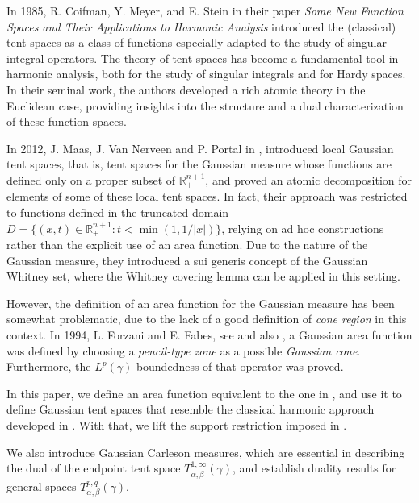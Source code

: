 \documentclass[leqno,11pt]{amsart}
\theoremstyle{plain}
\theoremstyle{remark}
\begin{document}
In 1985, R. Coifman, Y. Meyer, and E. Stein in their paper {\em Some New Function Spaces and Their Applications to Harmonic Analysis} \cite{cms} introduced the (classical)  tent spaces as a class of functions especially adapted to the study of singular integral operators. The theory of tent spaces has become a fundamental tool in harmonic analysis, both for the study of singular integrals and for Hardy spaces. In their seminal work, the authors developed a rich atomic theory in the Euclidean case, providing insights into the structure and a dual characterization of these function spaces.

In 2012, J. Maas, J. Van Nerveen and P. Portal in \cite{MNP}, 
introduced local Gaussian tent spaces, that is, tent spaces for the Gaussian measure whose functions are defined only on a proper subset of $\mathbb{R}^{n+1}_+$,  
and proved an atomic decomposition for elements of some of these local tent spaces. 
In fact, their approach was restricted to functions defined in the truncated domain \( D = \{(x,t)\in \mathbb{R}^{n+1}_+ : t < \min (1, 1/|x|)\} \), relying on ad hoc constructions rather than the explicit use of an area function. 
Due to the nature of the Gaussian measure, they introduced a sui generis concept of the Gaussian Whitney set, where the Whitney covering lemma can be applied in this setting.  


However, the definition of an area function for the Gaussian measure has been
somewhat problematic, due to the lack of a good definition of
\emph{cone region} in this context. In 1994, L. Forzani and E.
Fabes, see \cite{for} and also \cite{FSU}, a Gaussian area function was defined by choosing a {\em pencil-type zone} as a possible {\em Gaussian cone}. Furthermore, the $L^p(\gamma)$ boundedness of that operator was proved. 


In this paper, we define an area function equivalent to the one in \cite{FSU}, and use it to define Gaussian tent spaces that resemble the classical harmonic approach developed in \cite{cms}. With that, we lift the support restriction imposed in \cite{MNP}.  


  

We also introduce Gaussian Carleson measures, which are essential in describing the dual of the endpoint tent space \( T^{1,\infty}_{\alpha, \beta}(\gamma) \), and establish duality results for general spaces \( T^{p,q}_{\alpha, \beta}(\gamma) \).  
 
\end{document}
